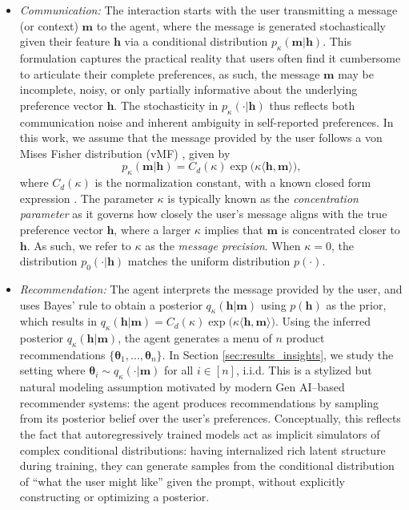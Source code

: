 \documentclass[12pt]{article}
\theoremstyle{definition}
\theoremstyle{remark}
\begin{document}
\begin{itemize}
    \item[(i)] \textit{Communication:} The interaction starts with the user transmitting a message (or context) $\mathbf{m}$ to the agent, where the message is generated stochastically given their feature $\mathbf{h}$ via a conditional distribution $p_{\kappa}(\mathbf{m}|\mathbf{h})$. This formulation captures the practical reality that users often find it cumbersome to articulate their complete preferences, as such, the message $\mathbf{m}$ may be incomplete, noisy, or only partially informative about the underlying preference vector $\mathbf{h}$. The stochasticity in $p_{\kappa}(\cdot|\mathbf{h})$ thus reflects both communication noise and inherent ambiguity in self-reported preferences. In this work, we assume that the message provided by the user follows a von Mises Fisher distribution (vMF) \citep{mardia2009directional}, given by
    \begin{equation}
    \label{eq:vMF_dist}
        p_{\kappa}(\mathbf{m}|\mathbf{h}) = C_d(\kappa) \exp \big(\kappa \langle\mathbf h, \mathbf m\rangle\big),
    \end{equation}
    where $C_d(\kappa)$ is the normalization constant, with a known closed form expression \citep[Chapter 9]{mardia2009directional}. The parameter $\kappa$ is typically known as the \textit{concentration parameter} as it governs how closely the user's message aligns with the true preference vector $\mathbf{h}$, where a larger $\kappa$ implies that $\mathbf{m}$ is concentrated closer to $\mathbf{h}$. As such, we refer to $\kappa$ as the \textit{message precision}. When $\kappa=0$, the distribution $p_{0}(\cdot|\mathbf{h})$ matches the uniform distribution $p(\cdot)$.

    \item[(ii)] \textit{Recommendation:} The agent interprets the message provided by the user, and uses Bayes' rule to obtain a posterior $q_\kappa(\mathbf{h}|\mathbf{m})$ using $p(\mathbf{h})$ as the prior, which results in
    $q_\kappa(\mathbf{h}|\mathbf{m}) = C_d(\kappa) \exp\big(\kappa \langle \mathbf{h},\mathbf{m}\rangle\big)$. Using the inferred posterior $q_{\kappa}(\mathbf{h}|\mathbf{m})$, the agent generates a menu of $n$ product recommendations $\{\boldsymbol\theta_1, \dots, \boldsymbol \theta_n\}$. In Section \ref{sec:results_insights}, we study the setting where $\boldsymbol{\theta}_i \sim q_{\kappa}(\cdot|\mathbf{m})$ for all $i\in[n]$, i.i.d. This is a stylized but natural modeling assumption motivated by modern Gen AI–based recommender systems: the agent produces recommendations by sampling from its posterior belief over the user’s preferences. Conceptually, this reflects the fact that autoregressively trained models act as implicit simulators of complex conditional distributions: having internalized rich latent structure during training, they can generate samples from the conditional distribution of “what the user might like” given the prompt, without explicitly constructing or optimizing a posterior.


\end{itemize}
\end{document}
